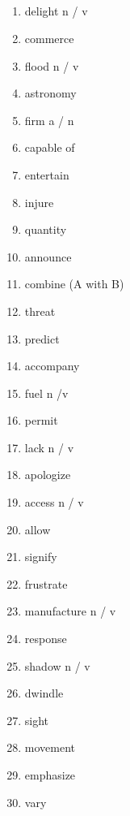 \documentclass[10pt, a4paper, landscape]{oblivoir}
\begin{document}
\begin{multicols}{3}
    \section{}
    \begin{enumerate}
        \item delight n / v
        \item commerce 
        \item flood n / v
        \item astronomy 
        \item firm a / n
        \item capable of
        \item entertain 
        \item injure 
        \item quantity 
        \item announce 
        \item combine (A with B)
        \item threat 
        \item predict 
        \item accompany 
        \item fuel n /v
        \item permit 
        \item lack n / v
        \item apologize 
        \item access n / v
        \item allow 
        \item signify 
        \item frustrate 
        \item manufacture n / v
        \item response 
        \item shadow n / v
        \item dwindle 
        \item sight 
        \item movement 
        \item emphasize 
        \item vary 

    \end{enumerate}
    

\end{multicols}
\end{document}
